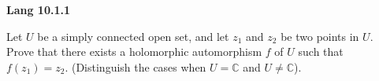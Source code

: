 \textbf{Lang 10.1.1}

Let $U$ be a simply connected open set, and let $z_1$ and $z_2$ be two points in $U$. Prove that there exists a 
holomorphic automorphism $f$ of $U$ such that $f(z_1) = z_2$. (Distinguish the cases when $U = \mathbb{C}$ and 
$U \neq \mathbb{C}$).

\begin{solution}
  \ \\
\end{solution}
